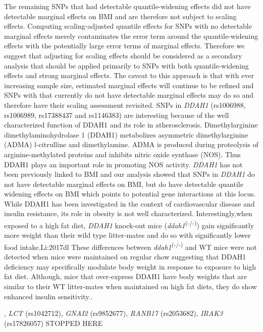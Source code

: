 \documentclass[12pt]{article}
\begin{document}
The remaining SNPs  that had detectable quantile-widening effects did not have detectable marginal effects on BMI and are therefore not subject to scaling effects. Computing scaling-adjusted quantile effects for SNPs with no detectable marginal effects merely contaminates the error term around the quantile-widening effects with the potentially large error terms of marginal effects. Therefore we suggest that adjusting for scaling effects should be considered as a secondary analysis that should be applied primarily to SNPs with both quantile-widening effects and strong marginal effects. The caveat to this approach is that with ever increasing sample size, estimated marginal effects will continue to be refined and SNPs with that currently do not have detectable marginal effects may do so and therefore have their scaling assessment revisited. SNPs in \textit{DDAH1} (rs1006988, rs1006989, rs17388437 and rs1146383) are interesting because of the well characterized function of DDAH1 and its role in atherosclerosis. Dimethylarginine dimethylaminohydrolase 1 (DDAH1) metabolizes asymmetric dimethylarginine (ADMA) l-citrulline and dimethylamine.\cite{Leiper:2011ee} ADMA is produced during proteolysis of arginine-methylated proteins and inhibits nitric oxide synthase (NOS).\cite{Leiper:2011ee} Thus DDAH1 plays an important role in promoting NOS activity. \textit{DDAH1} has not been previously linked to BMI and our analysis showed that SNPs in \textit{DDAH1} do not have detectable marginal effects on BMI, but do have detectable quantile widening effects on BMI which points to potential gene interactions at this locus. While DDAH1 has been investigated in the context of cardiovascular disease and insulin resistance, its role in obesity is not well characterized. Interestingly,when exposed to a high fat diet, \textit{DDAH1} knock-out mice (\textit{ddah1}\textsuperscript{(-/-)}) gain significantly more weight than their wild type litter-mates and do so with significantly lower food intake.{Li:2017dl} These differences between \textit{ddah1}\textsuperscript{(-/-)} and WT mice were not detected when mice were maintained on regular chow suggesting that DDAH1 deficiency may specifically modulate body weight in response to exposure to high fat diet. Although, mice that over-express DDAH1 have body weights that are similar to their WT litter-mates when maintained on high fat diets, they do show enhanced insulin sensitivity.\cite{Sydow:2008fx, Razny:2011dm}.


 
  , \textit{LCT} (rs1042712), \textit{GNAI2} (rs9852677), \textit{RANB17} (rs2053682), \textit{IRAK3} (rs17826057)
STOPPED HERE
\end{document}
